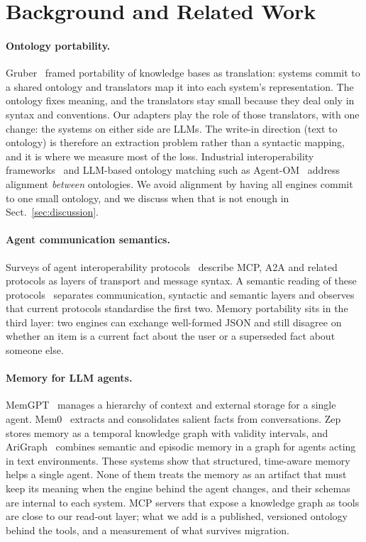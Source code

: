 \section{Background and Related Work}\label{sec:related}

\paragraph{Ontology portability.}
Gruber~\cite{gruber1993} framed portability of knowledge bases as translation: systems commit to
a shared ontology and translators map it into each system's representation. The ontology fixes
meaning, and the translators stay small because they deal only in syntax and conventions. Our
adapters play the role of those translators, with one change: the systems on either side are
LLMs. The write-in direction (text to ontology) is therefore an extraction problem rather than a
syntactic mapping, and it is where we measure most of the loss. Industrial interoperability
frameworks~\cite{ontointerop2025} and LLM-based ontology matching such as
Agent-OM~\cite{qiang2024agentom} address alignment \emph{between} ontologies. We avoid alignment
by having all engines commit to one small ontology, and we discuss when that is not enough in
Sect.~\ref{sec:discussion}.

\paragraph{Agent communication semantics.}
Surveys of agent interoperability protocols~\cite{ehtesham2025survey} describe MCP, A2A and
related protocols as layers of transport and message syntax. A semantic reading of these
protocols~\cite{beyondmessage2026} separates communication, syntactic and semantic layers and
observes that current protocols standardise the first two. Memory portability sits in the third
layer: two engines can exchange well-formed JSON and still disagree on whether an item is a
current fact about the user or a superseded fact about someone else.

\paragraph{Memory for LLM agents.}
MemGPT~\cite{packer2023memgpt} manages a hierarchy of context and external storage for a single
agent. Mem0~\cite{chhikara2025mem0} extracts and consolidates salient facts from conversations.
Zep~\cite{rasmussen2025zep} stores memory as a temporal knowledge graph with validity intervals,
and AriGraph~\cite{anokhin2024arigraph} combines semantic and episodic memory in a graph for
agents acting in text environments. These systems show that structured, time-aware memory helps
a single agent. None of them treats the memory as an artifact that must keep its meaning when
the engine behind the agent changes, and their schemas are internal to each system. MCP servers
that expose a knowledge graph as tools are close to our read-out layer; what we add is a
published, versioned ontology behind the tools, and a measurement of what survives migration.

